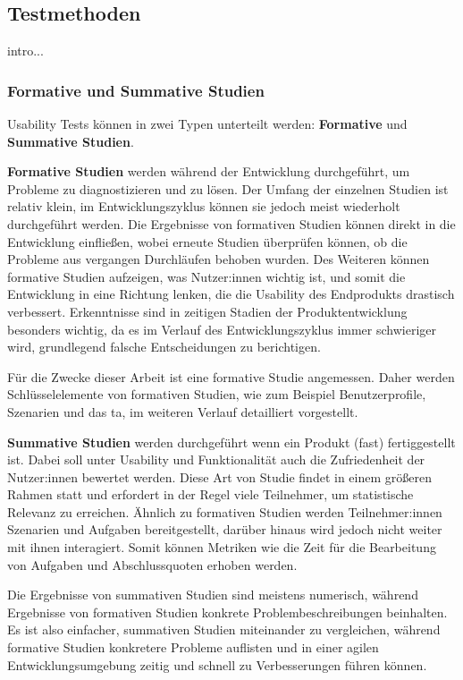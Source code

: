 
\subsection{Testmethoden}
intro...
\subsubsection{Formative und Summative Studien}
\label{section:formative-summative}
Usability Tests können in zwei Typen unterteilt werden: \textbf{Formative} und \textbf{Summative
  Studien}.

\textbf{Formative Studien} werden während der Entwicklung durchgeführt, um Probleme zu
diagnostizieren und zu lösen. Der Umfang der einzelnen Studien ist relativ klein, im
Entwicklungszyklus können sie jedoch meist wiederholt durchgeführt werden. Die Ergebnisse von
formativen Studien können direkt in die Entwicklung einfließen, wobei erneute Studien überprüfen
können, ob die Probleme aus vergangen Durchläufen behoben wurden. Des Weiteren können formative
Studien aufzeigen, was Nutzer:innen wichtig ist, und somit die Entwicklung in eine Richtung lenken,
die die Usability des Endprodukts drastisch verbessert. Erkenntnisse sind in zeitigen Stadien der
Produktentwicklung besonders wichtig, da es im Verlauf des Entwicklungszyklus immer schwieriger
wird, grundlegend falsche Entscheidungen zu berichtigen.

Für die Zwecke dieser Arbeit ist eine formative Studie angemessen. Daher werden Schlüsselelemente
von formativen Studien, wie zum Beispiel Benutzerprofile, Szenarien und das \acl{ta}, im weiteren
Verlauf detailliert vorgestellt.

\textbf{Summative Studien} werden durchgeführt wenn ein Produkt (fast) fertiggestellt ist. Dabei
soll unter Usability und Funktionalität auch die Zufriedenheit der Nutzer:innen bewertet werden.
Diese Art von Studie findet in einem größeren Rahmen statt und erfordert in der Regel viele
Teilnehmer, um statistische Relevanz zu erreichen. Ähnlich zu formativen Studien werden
Teilnehmer:innen Szenarien und Aufgaben bereitgestellt, darüber hinaus wird jedoch nicht weiter mit
ihnen interagiert. Somit können Metriken wie die Zeit für die Bearbeitung von Aufgaben und
Abschlussquoten erhoben werden.

Die Ergebnisse von summativen Studien sind meistens numerisch, während Ergebnisse von formativen
Studien konkrete Problembeschreibungen beinhalten. Es ist also einfacher, summativen Studien
miteinander zu vergleichen, während formative Studien konkretere Probleme auflisten und in einer
agilen Entwicklungsumgebung zeitig und schnell zu Verbesserungen führen können.

